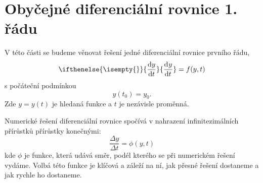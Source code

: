 \documentclass[a4paper,11pt,twoside]{article}
\renewcommand{\d}{\mathrm{d}}           %
\newcommand{\derivative}[3][]{\ifthenelse{\isempty{#1}}	    %
	{\frac{\d{#2}}{\d{#3}}}
	{\frac{\d^{#1}{#2}}{\d{#3}^{#1}}}
}
\theoremstyle{red}
\theoremstyle{green}
\begin{document}
\section{Obyčejné diferenciální rovnice 1. řádu}
\label{sec:ODR1}
    V této části se budeme věnovat řešení jedné diferenciální rovnice prvního řádu,
    \begin{equation}
        \derivative{y}{t}=f(y,t)
    \end{equation}
    s počáteční podmínkou
    \begin{equation}
        y(t_{0})=y_{0}.
    \end{equation}
    Zde $y=y(t)$ je hledaná funkce a $t$ je nezávisle proměnná.
    
    Numerické řešení diferenciální rovnice spočívá v nahrazení infinitezimálních přírůstků přírůstky konečnými:
    \begin{equation}\label{eq:Diference}
        \frac{\Delta y}{\Delta t}=\phi(y,t)
    \end{equation}
    kde $\phi$ je funkce, která udává směr, podél kterého se při numerickém řešení vydáme.
    Volbá této funkce je klíčová a záleží na ní, jak přesné řešení dostaneme a jak rychle ho dostaneme.
\end{document}

